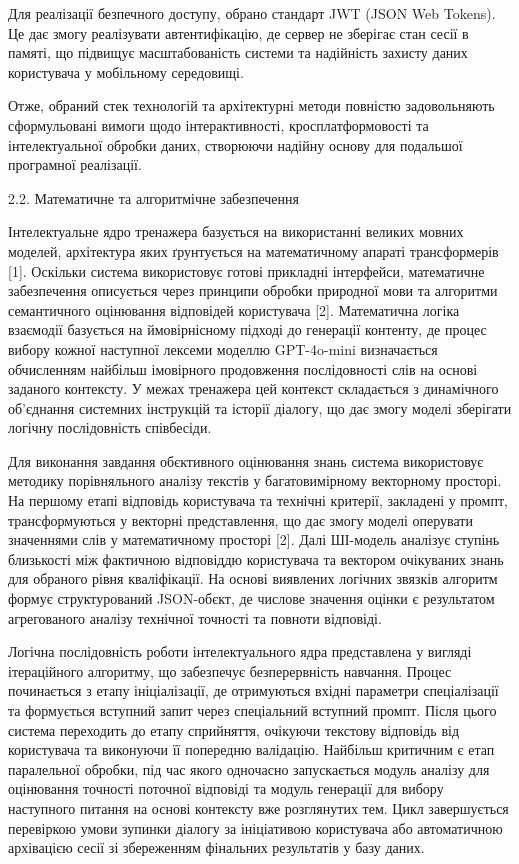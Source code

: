 Для реалізації безпечного доступу, обрано стандарт JWT (JSON Web
Tokens). Це дає змогу реалізувати автентифікацію, де сервер не зберігає
стан сесії в пам\textquotesingle яті, що підвищує масштабованість
системи та надійність захисту даних користувача у мобільному середовищі.

Отже, обраний стек технологій та архітектурні методи повністю
задовольняють сформульовані вимоги щодо інтерактивності,
кросплатформовості та інтелектуальної обробки даних, створюючи надійну
основу для подальшої програмної реалізації.

\protect{}\label{_Toc228981060}{}2.2. Математичне та
алгоритмічне забезпечення

Інтелектуальне ядро тренажера базується на використанні великих мовних
моделей, архітектура яких ґрунтується на математичному апараті
трансформерів {[}1{]}. Оскільки система використовує готові прикладні
інтерфейси, математичне забезпечення описується через принципи обробки
природної мови та алгоритми семантичного оцінювання відповідей
користувача {[}2{]}. Математична логіка взаємодії базується на
ймовірнісному підході до генерації контенту, де процес вибору кожної
наступної лексеми моделлю GPT-4o-mini визначається обчисленням найбільш
імовірного продовження послідовності слів на основі заданого контексту.
У межах тренажера цей контекст складається з динамічного об'єднання
системних інструкцій та історії діалогу, що дає змогу моделі зберігати
логічну послідовність співбесіди.

Для виконання завдання об\textquotesingle єктивного оцінювання знань
система використовує методику порівняльного аналізу текстів у
багатовимірному векторному просторі. На першому етапі відповідь
користувача та технічні критерії, закладені у промпт, трансформуються у
векторні представлення, що дає змогу моделі оперувати значеннями слів у
математичному просторі {[}2{]}. Далі ШІ-модель аналізує ступінь
близькості між фактичною відповіддю користувача та вектором очікуваних
знань для обраного рівня кваліфікації. На основі виявлених логічних
зв\textquotesingle язків алгоритм формує структурований
JSON-об\textquotesingle єкт, де числове значення оцінки є результатом
агрегованого аналізу технічної точності та повноти відповіді.

Логічна послідовність роботи інтелектуального ядра представлена у
вигляді ітераційного алгоритму, що забезпечує безперервність навчання.
Процес починається з етапу ініціалізації, де отримуються вхідні
параметри спеціалізації та формується вступний запит через спеціальний
вступний промпт. Після цього система переходить до етапу сприйняття,
очікуючи текстову відповідь від користувача та виконуючи її попередню
валідацію. Найбільш критичним є етап паралельної обробки, під час якого
одночасно запускається модуль аналізу для оцінювання точності поточної
відповіді та модуль генерації для вибору наступного питання на основі
контексту вже розглянутих тем. Цикл завершується перевіркою умови
зупинки діалогу за ініціативою користувача або автоматичною архівацією
сесії зі збереженням фінальних результатів у базу даних.

